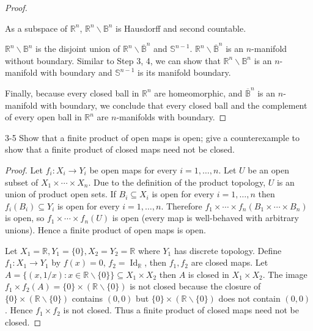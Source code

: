 \begin{proof}
\begin{enumerate}[label={\textbf{Step \arabic*.}},itemindent=1cm]
		      As a subspace of $\mathbb{R}^{n}$, $\mathbb{R}^{n}\smallsetminus \mathbb{B}^{n}$ is Hausdorff and second countable.

		      $\mathbb{R}^{n}\smallsetminus\mathbb{B}^{n}$ is the disjoint union of $\mathbb{R}^{n}\smallsetminus\overline{\mathbb{B}}^{n}$ and $\mathbb{S}^{n-1}$. $\mathbb{R}^{n}\smallsetminus\overline{\mathbb{B}}^{n}$ is an $n$-manifold without boundary. Similar to Step 3, 4, we can show that $\mathbb{R}^{n}\smallsetminus \mathbb{B}^{n}$ is an $n$-manifold with boundary and $\mathbb{S}^{n-1}$ is its manifold boundary.
	\end{enumerate}

	Finally, because every closed ball in $\mathbb{R}^{n}$ are homeomorphic, and $\overline{\mathbb{B}}^{n}$ is an $n$-manifold with boundary, we conclude that every closed ball and the complement of every open ball in $\mathbb{R}^{n}$ are $n$-manifolds with boundary.
\end{proof}

\begin{problem}{3-5}
Show that a finite product of open maps is open; give a counterexample to show that a finite product of closed maps need not be closed.
\end{problem}

\begin{proof}
	Let $f_{i}: X_{i}\to Y_{i}$ be open maps for every $i = 1,\ldots,n$. Let $U$ be an open subset of $X_{1}\times\cdots\times X_{n}$. Due to the definition of the product topology, $U$ is an union of product open sets. If $B_{i}\subseteq X_{i}$ is open for every $i = 1,\ldots,n$ then $f_{i}(B_{i})\subseteq Y_{i}$ is open for every $i = 1,\ldots,n$. Therefore $f_{1}\times\cdots\times f_{n}(B_{1}\times\cdots\times B_{n})$ is open, so $f_{1}\times\cdots\times f_{n}(U)$ is open (every map is well-behaved with arbitrary unions). Hence a finite product of open maps is open.

	Let $X_{1} = \mathbb{R}, Y_{1} = \{ 0 \}, X_{2} = Y_{2} = \mathbb{R}$ where $Y_{1}$ has discrete topology. Define $f_{1}: X_{1}\to Y_{1}$ by $f(x) = 0$, $f_{2} = \operatorname{Id}_{\mathbb{R}}$, then $f_{1}, f_{2}$ are closed maps. Let $A = \{ (x, 1/x): x\in\mathbb{R}\smallsetminus\{0\} \}\subseteq X_{1}\times X_{2}$ then $A$ is closed in $X_{1}\times X_{2}$. The image $f_{1}\times f_{2}(A) = \{ 0 \}\times (\mathbb{R}\smallsetminus\{0\})$ is not closed because the closure of $\{ 0 \}\times (\mathbb{R}\smallsetminus\{0\})$ contains $(0, 0)$ but $\{ 0 \}\times (\mathbb{R}\smallsetminus\{0\})$ does not contain $(0, 0)$. Hence $f_{1}\times f_{2}$ is not closed. Thus a finite product of closed maps need not be closed.
\end{proof}

